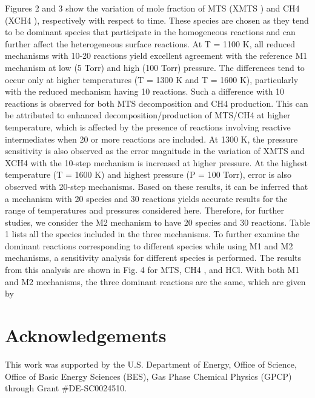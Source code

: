 \documentclass[final, letterpaper, square, comma, numbers, sort&compress]{elsarticle}
\begin{document}
Figures 2 and 3 show the variation of mole fraction of MTS (XMTS ) and CH4 (XCH4 ), respectively
with respect to time. These species are chosen as they tend to be dominant species that participate in
the homogeneous reactions and can further affect the heterogeneous surface reactions. At T = 1100 K, all
reduced mechanisms with 10-20 reactions yield excellent agreement with the reference M1 mechanism at
low (5 Torr) and high (100 Torr) pressure. The differences tend to occur only at higher temperatures (T =
1300 K and T = 1600 K), particularly with the reduced mechanism having 10 reactions. Such a difference
with 10 reactions is observed for both MTS decomposition and CH4 production. This can be attributed to
enhanced decomposition/production of MTS/CH4 at higher temperature, which is affected by the presence of
reactions involving reactive intermediates when 20 or more reactions are included. At 1300 K, the pressure
sensitivity is also observed as the error magnitude in the variation of XMTS and XCH4 with the 10-step
mechanism is increased at higher pressure. At the highest temperature (T = 1600 K) and highest pressure
(P = 100 Torr), error is also observed with 20-step mechanisms. Based on these results, it can be inferred
that a mechanism with 20 species and 30 reactions yields accurate results for the range of temperatures and
pressures considered here. Therefore, for further studies, we consider the M2 mechanism to have 20 species
and 30 reactions. Table 1 lists all the species included in the three mechanisms.
To further examine the dominant reactions corresponding to different species while using M1 and M2
mechanisms, a sensitivity analysis for different species is performed. The results from this analysis are shown
in Fig. 4 for MTS, CH4 , and HCl. With both M1 and M2 mechanisms, the three dominant reactions are the
same, which are given by


\section*{Acknowledgements}
This work was supported by the U.S. Department of Energy, Office of Science, Office of Basic Energy Sciences (BES), Gas Phase Chemical Physics (GPCP) through Grant \#DE-SC0024510.



\end{document}
